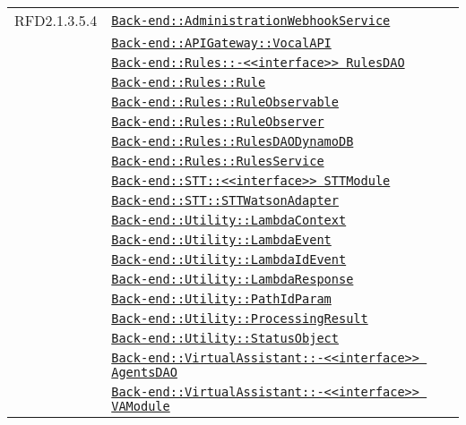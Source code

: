 \begin{longtable}{|>{\centering}m{3cm}|m{10cm}<{\centering}|}
RFD2.1.3.5.4 & \hyperref[Back-end::AdministrationWebhookService]{\texttt{Back-end::AdministrationWebhookService}}\\
& \hyperref[Back-end::APIGateway::VocalAPI]{\texttt{Back-end::APIGateway::VocalAPI}}\\
& \hyperref[Back-end::Rules::<<interface>> RulesDAO]{\texttt{Back-end::Rules::-\linebreak <<interface>> RulesDAO}}\\
& \hyperref[Back-end::Rules::Rule]{\texttt{Back-end::Rules::Rule}}\\
& \hyperref[Back-end::Rules::RuleObservable]{\texttt{Back-end::Rules::RuleObservable}}\\
& \hyperref[Back-end::Rules::RuleObserver]{\texttt{Back-end::Rules::RuleObserver}}\\
& \hyperref[Back-end::Rules::RulesDAODynamoDB]{\texttt{Back-end::Rules::RulesDAODynamoDB}}\\
& \hyperref[Back-end::Rules::RulesService]{\texttt{Back-end::Rules::RulesService}}\\
& \hyperref[Back-end::STT::<<interface>> STTModule]{\texttt{Back-end::STT::<<interface>> STTModule}}\\
& \hyperref[Back-end::STT::STTWatsonAdapter]{\texttt{Back-end::STT::STTWatsonAdapter}}\\
& \hyperref[Back-end::Utility::LambdaContext]{\texttt{Back-end::Utility::LambdaContext}}\\
& \hyperref[Back-end::Utility::LambdaEvent]{\texttt{Back-end::Utility::LambdaEvent}}\\
& \hyperref[Back-end::Utility::LambdaIdEvent]{\texttt{Back-end::Utility::LambdaIdEvent}}\\
& \hyperref[Back-end::Utility::LambdaResponse]{\texttt{Back-end::Utility::LambdaResponse}}\\
& \hyperref[Back-end::Utility::PathIdParam]{\texttt{Back-end::Utility::PathIdParam}}\\
& \hyperref[Back-end::Utility::ProcessingResult]{\texttt{Back-end::Utility::ProcessingResult}}\\
& \hyperref[Back-end::Utility::StatusObject]{\texttt{Back-end::Utility::StatusObject}}\\
& \hyperref[Back-end::VirtualAssistant::<<interface>> AgentsDAO]{\texttt{Back-end::VirtualAssistant::-\linebreak <<interface>> AgentsDAO}}\\
& \hyperref[Back-end::VirtualAssistant::<<interface>> VAModule]{\texttt{Back-end::VirtualAssistant::-\linebreak <<interface>> VAModule}}\\

\end{longtable}
